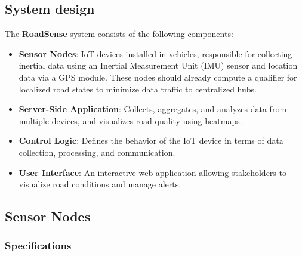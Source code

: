 \documentclass[12pt,a4paper]{article}
\begin{document}
\subsection*{System design}

The \textbf{RoadSense} system consists of the following components:

\begin{itemize}
\item \textbf{Sensor Nodes}: IoT devices installed in vehicles, responsible for collecting inertial data using an Inertial Measurement Unit (IMU) sensor and location data via a GPS module. These nodes should already compute a qualifier for localized road states to minimize data traffic to centralized hubs.

\item \textbf{Server-Side Application}: Collects, aggregates, and analyzes data from multiple devices, and visualizes road quality using heatmaps.

\item \textbf{Control Logic}: Defines the behavior of the IoT device in terms of data collection, processing, and communication.

\item \textbf{User Interface}: An interactive web application allowing stakeholders to visualize road conditions and manage alerts.
\end{itemize}

\subsection*{Sensor Nodes}

\subsubsection*{Specifications}
\end{document}
